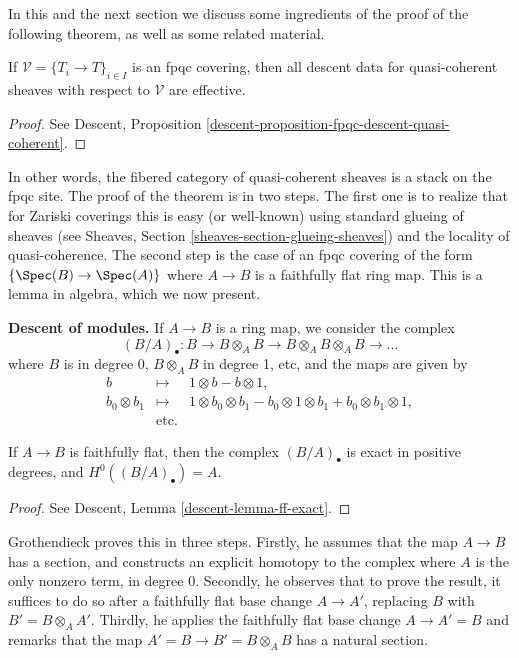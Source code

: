 \noindent
In this and the next section we discuss some ingredients of the proof
of the following theorem, as well as some related material.

\begin{theorem}
\label{theorem-descent-quasi-coherent}
If $\mathcal{V} = \{T_i \to T\}_{i\in I}$ is an fpqc covering, then all
descent data for quasi-coherent sheaves with respect to $\mathcal{V}$
are effective.
\end{theorem}

\begin{proof}
See
Descent, Proposition \ref{descent-proposition-fpqc-descent-quasi-coherent}.
\end{proof}

\noindent
In other words, the fibered category of quasi-coherent sheaves is a stack on
the fpqc site.
The proof of the theorem is in two steps. The first one is to realize that for
Zariski coverings this is easy (or well-known) using standard glueing of
sheaves (see
Sheaves, Section \ref{sheaves-section-glueing-sheaves})
and the locality of quasi-coherence. The second step is the case of an
fpqc covering of the form $\{\Spec(B) \to \Spec(A)\}$
where $A \to B$ is a faithfully flat ring map.
This is a lemma in algebra, which we now present.

\medskip\noindent
{\bf Descent of modules.}
If $A \to B$ is a ring map, we consider the complex
$$
(B/A)_\bullet : B \to B \otimes_A B \to B \otimes_A B \otimes_A B \to \ldots
$$
where $B$ is in degree 0, $B \otimes_A B$ in degree 1, etc, and the maps are
given by
\begin{eqnarray*}
b & \mapsto & 1 \otimes b - b \otimes 1, \\
b_0 \otimes b_1 & \mapsto & 1 \otimes b_0 \otimes b_1 - b_0 \otimes 1 \otimes
b_1 + b_0 \otimes b_1 \otimes 1, \\
& \text{etc.}
\end{eqnarray*}

\begin{lemma}
\label{lemma-algebra-descent}
If $A \to B$ is faithfully flat, then the complex $(B/A)_\bullet$ is exact in
positive degrees, and $H^0((B/A)_\bullet) = A$.
\end{lemma}

\begin{proof}
See Descent, Lemma \ref{descent-lemma-ff-exact}.
\end{proof}

\noindent
Grothendieck proves this in three steps. Firstly, he assumes that the map $A
\to B$ has a section, and constructs an explicit homotopy to the complex where
$A$ is the only nonzero term, in degree 0. Secondly, he observes that to prove
the result, it suffices to do so after a faithfully flat base change $A \to
A'$, replacing $B$ with $B' = B \otimes_A A'$. Thirdly, he applies the
faithfully flat base change $A \to A' =B$ and remarks that the map $A' = B \to
B' = B \otimes_A B$ has a natural section.

